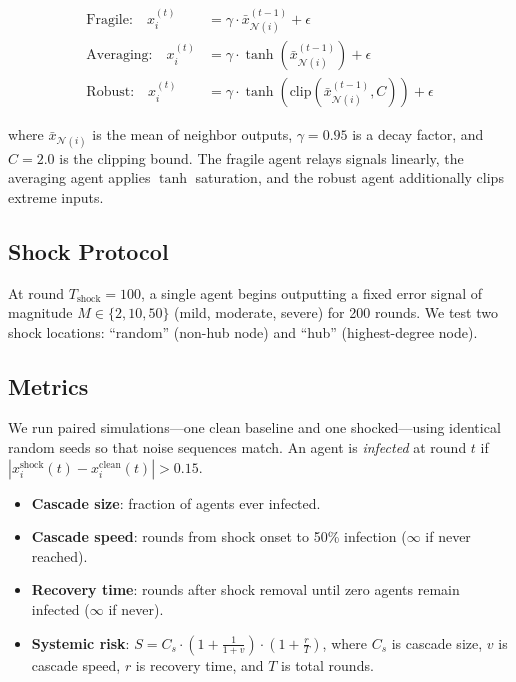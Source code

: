 \documentclass[11pt]{article}
\begin{document}
\begin{align}
  \text{Fragile:} \quad x_i^{(t)} &= \gamma \cdot \bar{x}_{\mathcal{N}(i)}^{(t-1)} + \epsilon \label{eq:fragile} \\
  \text{Averaging:} \quad x_i^{(t)} &= \gamma \cdot \tanh\!\left(\bar{x}_{\mathcal{N}(i)}^{(t-1)}\right) + \epsilon \label{eq:averaging} \\
  \text{Robust:} \quad x_i^{(t)} &= \gamma \cdot \tanh\!\left(\text{clip}(\bar{x}_{\mathcal{N}(i)}^{(t-1)}, C)\right) + \epsilon \label{eq:robust}
\end{align}

where $\bar{x}_{\mathcal{N}(i)}$ is the mean of neighbor outputs, $\gamma = 0.95$ is a decay factor, and $C = 2.0$ is the clipping bound.
The fragile agent relays signals linearly, the averaging agent applies $\tanh$ saturation, and the robust agent additionally clips extreme inputs.

\subsection{Shock Protocol}

At round $T_\text{shock} = 100$, a single agent begins outputting a fixed error signal of magnitude $M \in \{2, 10, 50\}$ (mild, moderate, severe) for 200 rounds.
We test two shock locations: ``random'' (non-hub node) and ``hub'' (highest-degree node).

\subsection{Metrics}

We run paired simulations---one clean baseline and one shocked---using identical random seeds so that noise sequences match.
An agent is \emph{infected} at round $t$ if $|x_i^{\text{shock}}(t) - x_i^{\text{clean}}(t)| > 0.15$.

\begin{itemize}
  \item \textbf{Cascade size}: fraction of agents ever infected.
  \item \textbf{Cascade speed}: rounds from shock onset to 50\% infection ($\infty$ if never reached).
  \item \textbf{Recovery time}: rounds after shock removal until zero agents remain infected ($\infty$ if never).
  \item \textbf{Systemic risk}: $S = C_s \cdot (1 + \frac{1}{1 + v}) \cdot (1 + \frac{r}{T})$, where $C_s$ is cascade size, $v$ is cascade speed, $r$ is recovery time, and $T$ is total rounds.
\end{itemize}
\end{document}
